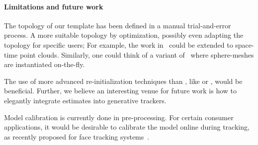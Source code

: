 \paragraph{Limitations and future work} 
The topology of our template has been defined in a manual trial-and-error process. A more suitable topology  by optimization, possibly even adapting the topology for specific users; For example, the work in~\cite{thiery2016spheremesh} could be extended to space-time point clouds. Similarly, one could think of a variant of~\cite{newcombe2015dynfusion} where sphere-meshes are instantiated on-the-fly.
% 
\begin{draft}
The use of more advanced re-initialization techniques than \cite{qian2014realtime}, like \cite{krupka2014discriminative} or \cite{oberweger2015feedback}, would be beneficial. Further, we believe an interesting venue for future work is how to elegantly integrate  estimates into generative trackers.
\end{draft}
% 
Model calibration is currently done in pre-processing. For certain consumer applications, it would be desirable to calibrate the model online during tracking, as recently proposed for face tracking systems~\cite{bouaziz2013online}. 
% 
